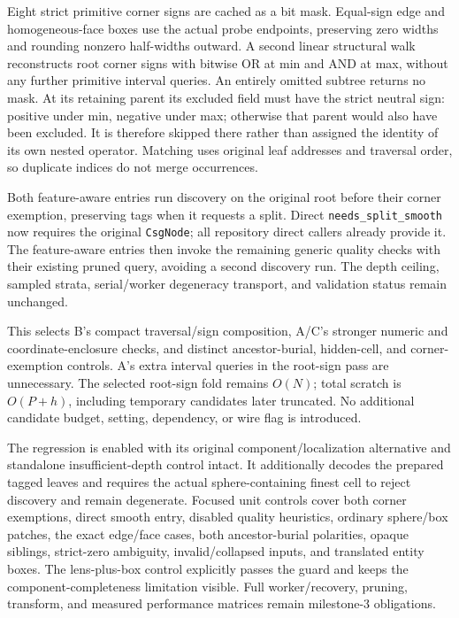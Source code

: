 \documentclass[11pt]{article}
\begin{document}
Eight strict primitive corner signs are cached as a bit mask. Equal-sign edge
and homogeneous-face boxes use the actual probe endpoints, preserving zero
widths and rounding nonzero half-widths outward. A second linear structural
walk reconstructs root corner signs with bitwise OR at min and AND at max,
without any further primitive interval queries. An entirely omitted subtree
returns no mask. At its retaining parent its excluded field must have the
strict neutral sign: positive under min, negative under max; otherwise that
parent would also have been excluded. It is therefore skipped there rather
than assigned the identity of its own nested operator. Matching uses original
leaf addresses and traversal order, so duplicate indices do not merge
occurrences.

Both feature-aware entries run discovery on the original root before their
corner exemption, preserving tags when it requests a split. Direct
\texttt{needs\_split\_smooth} now requires the original \texttt{CsgNode};
all repository direct callers already provide it. The feature-aware entries
then invoke the remaining generic quality checks with their existing pruned
query, avoiding a second discovery run. The depth ceiling, sampled strata,
serial/worker degeneracy transport, and validation status remain unchanged.

This selects B's compact traversal/sign composition, A/C's stronger numeric
and coordinate-enclosure checks, and distinct ancestor-burial, hidden-cell,
and corner-exemption controls. A's extra interval queries in the root-sign
pass are unnecessary. The selected root-sign fold remains \(O(N)\); total
scratch is \(O(P+h)\), including temporary candidates later truncated. No
additional candidate budget, setting, dependency, or wire flag is introduced.

The regression is enabled with its original component/localization alternative
and standalone insufficient-depth control intact. It additionally decodes the
prepared tagged leaves and requires the actual sphere-containing finest cell
to reject discovery and remain degenerate. Focused unit controls cover both
corner exemptions, direct smooth entry, disabled quality heuristics, ordinary
sphere/box patches, the exact edge/face cases, both ancestor-burial polarities,
opaque siblings, strict-zero ambiguity, invalid/collapsed inputs, and translated
entity boxes. The lens-plus-box control explicitly passes the guard and keeps
the component-completeness limitation visible. Full worker/recovery, pruning,
transform, and measured performance matrices remain milestone-3 obligations.
\end{document}
